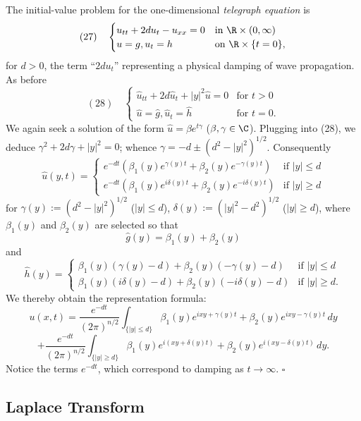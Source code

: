 \begin{example}
\label{ex:telegraph-equation-fourier-transform}
The initial-value problem for the one-dimensional \textit{telegraph equation} is
$$(27) \quad \begin{cases} u_{tt}+2du_t-u_{xx}=0 & \text{in } \R\times(0,\infty) \\ u=g, u_t=h & \text{on } \R\times\{t=0\}, \end{cases}$$
for $d>0$, the term ``$2du_t$'' representing a physical damping of wave propagation. As before
$$(28) \quad \begin{cases} \hat u_{tt}+2d\hat u_t+|y|^2\hat u=0 & \text{for } t>0 \\ \hat u=\hat g, \hat u_t=\hat h & \text{for } t=0. \end{cases}$$
We again seek a solution of the form $\hat u=\beta e^{t\gamma}$ ($\beta,\gamma\in\C$). Plugging into (28), we deduce $\gamma^2+2d\gamma+|y|^2=0$; whence $\gamma=-d\pm(d^2-|y|^2)^{1/2}$. Consequently
$$\hat u(y,t) = \begin{cases} e^{-dt}(\beta_1(y)e^{\gamma(y)t}+\beta_2(y)e^{-\gamma(y)t}) & \text{if } |y|\le d \\ e^{-dt}(\beta_1(y)e^{i\delta(y)t}+\beta_2(y)e^{-i\delta(y)t}) & \text{if } |y|\ge d \end{cases}$$
for $\gamma(y):=(d^2-|y|^2)^{1/2}$ ($|y|\le d$), $\delta(y):=(|y|^2-d^2)^{1/2}$ ($|y|\ge d$), where $\beta_1(y)$ and $\beta_2(y)$ are selected so that
$$\hat g(y) = \beta_1(y)+\beta_2(y)$$
and
$$\hat h(y) = \begin{cases} \beta_1(y)(\gamma(y)-d)+\beta_2(y)(-\gamma(y)-d) & \text{if } |y|\le d \\ \beta_1(y)(i\delta(y)-d)+\beta_2(y)(-i\delta(y)-d) & \text{if } |y|\ge d. \end{cases}$$
We thereby obtain the representation formula:
$$u(x,t) = \frac{e^{-dt}}{(2\pi)^{n/2}}\int_{\{|y|\le d\}} \beta_1(y)e^{ixy+\gamma(y)t}+\beta_2(y)e^{ixy-\gamma(y)t}\,dy$$
$$+ \frac{e^{-dt}}{(2\pi)^{n/2}}\int_{\{|y|\ge d\}} \beta_1(y)e^{i(xy+\delta(y)t)}+\beta_2(y)e^{i(xy-\delta(y)t)}\,dy.$$
Notice the terms $e^{-dt}$, which correspond to damping as $t\to\infty$. $\square$
\end{example}

\subsection{Laplace Transform}
\label{sec:laplace-transform}

